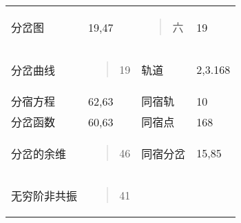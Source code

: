\documentclass{article}
\begin{document}
\begin{longtable}[]{@{}llll@{}}
\begin{minipage}[t]{0.22\columnwidth}
分岔图\strut
\end{minipage} & \begin{minipage}[t]{0.22\columnwidth}\raggedright
19,47\strut
\end{minipage} & \begin{minipage}[t]{0.22\columnwidth}\raggedright
\begin{quote}
六
\end{quote}\strut
\end{minipage} & \begin{minipage}[t]{0.22\columnwidth}\raggedright
19\strut
\end{minipage}\tabularnewline
\begin{minipage}[t]{0.22\columnwidth}\raggedright
分岔曲线\strut
\end{minipage} & \begin{minipage}[t]{0.22\columnwidth}\raggedright
\begin{quote}
19
\end{quote}\strut
\end{minipage} & \begin{minipage}[t]{0.22\columnwidth}\raggedright
轨道\strut
\end{minipage} & \begin{minipage}[t]{0.22\columnwidth}\raggedright
2,3.168\strut
\end{minipage}\tabularnewline
分宿方程 & 62,63 & 同宿轨 & 10\tabularnewline
分岔函数 & 60,63 & 同宿点 & 168\tabularnewline
\begin{minipage}[t]{0.22\columnwidth}\raggedright
分岔的余维\strut
\end{minipage} & \begin{minipage}[t]{0.22\columnwidth}\raggedright
\begin{quote}
46
\end{quote}\strut
\end{minipage} & \begin{minipage}[t]{0.22\columnwidth}\raggedright
同宿分岔\strut
\end{minipage} & \begin{minipage}[t]{0.22\columnwidth}\raggedright
15,85\strut
\end{minipage}\tabularnewline
\begin{minipage}[t]{0.22\columnwidth}\raggedright
无穷阶非共振\strut
\end{minipage} & \begin{minipage}[t]{0.22\columnwidth}\raggedright
\begin{quote}
41
\end{quote}\strut

\end{minipage}
\end{longtable}
\end{document}
